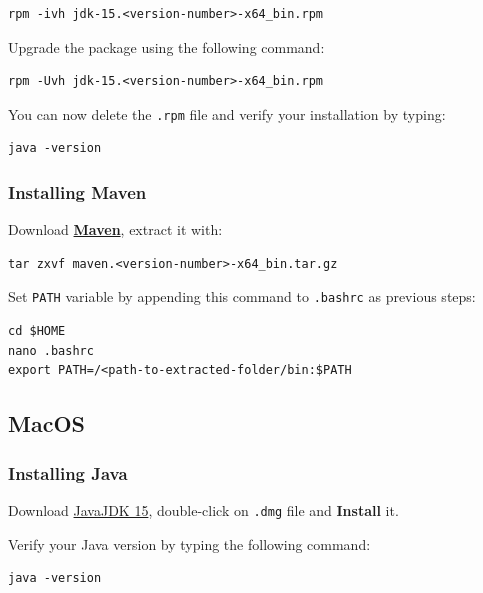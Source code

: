 \documentclass[table, 12pt]{article}
\begin{document}
\begin{verbatim}
rpm -ivh jdk-15.<version-number>-x64_bin.rpm
\end{verbatim}

Upgrade the package using the following command:

\begin{verbatim}
rpm -Uvh jdk-15.<version-number>-x64_bin.rpm 
\end{verbatim}

You can now delete the \texttt{.rpm} file and verify your installation
by typing:

\begin{verbatim}
java -version
\end{verbatim}

\subsubsection{Installing Maven}\label{installing-maven-1}

Download
\textbf{\href{https://mirror.nohup.it/apache/maven/maven-3/3.6.3/binaries/apache-maven-3.6.3-bin.tar.gz}{Maven}},
extract it with:

\begin{verbatim}
tar zxvf maven.<version-number>-x64_bin.tar.gz
\end{verbatim}

Set \texttt{PATH} variable by appending this command to \texttt{.bashrc}
as previous steps:

\begin{verbatim}
cd $HOME 
nano .bashrc
export PATH=/<path-to-extracted-folder/bin:$PATH
\end{verbatim}

\subsection{MacOS}\label{macos}

\subsubsection{Installing Java}\label{installing-java-2}

Download
\href{https://www.oracle.com/java/technologies/javase/jdk15-archive-downloads.html}{JavaJDK
    15}, double-click on \texttt{.dmg} file and \textbf{Install} it.

Verify your Java version by typing the following command:

\begin{verbatim}
java -version
\end{verbatim}
\end{document}
